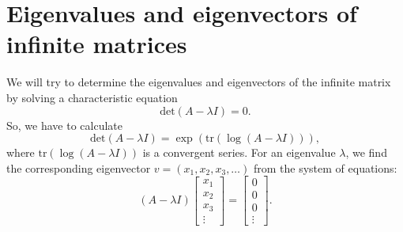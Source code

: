 \section{Eigenvalues and eigenvectors of infinite matrices }
We will try to determine the eigenvalues and eigenvectors of the infinite matrix by solving a characteristic equation
\[
\text{det}(A - \lambda I) = 0.
\]
So, we have to calculate
\[
\text{det}(A - \lambda I) = \exp(\text{tr}(\log(A - \lambda I))),
\]
where \(\text{tr}(\log(A - \lambda I))\) is a convergent series. For an  eigenvalue \(\lambda\), we find the corresponding eigenvector \(v = (x_1, x_2, x_3, \ldots)\) from the system of equations:
\[
(A - \lambda I) \begin{bmatrix} x_1 \\ x_2 \\ x_3 \\ \vdots \end{bmatrix} = \begin{bmatrix} 0 \\ 0 \\ 0 \\ \vdots \end{bmatrix}.
\]  

